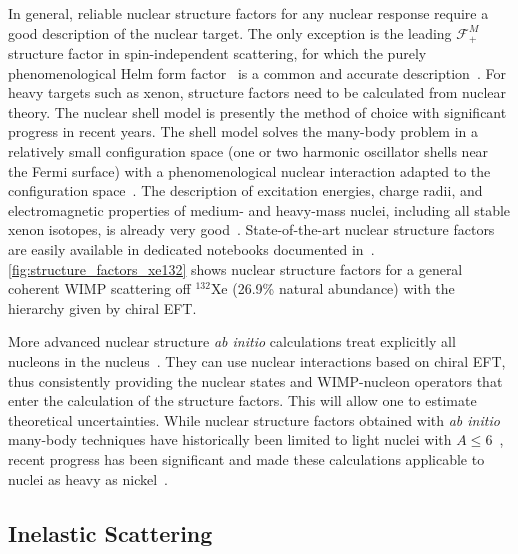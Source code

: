 In general, reliable nuclear structure factors for any nuclear response require a good description of the nuclear target. The only exception is the leading $\mathcal{F}^M_+$ structure factor in spin-independent scattering, for which the purely phenomenological Helm form factor~\cite{Helm:1956zz,Lewin:1995rx} is a common and accurate description~\cite{Vietze:2014vsa}. For heavy targets such as xenon, structure factors need to be calculated from nuclear theory. The nuclear shell model is presently the method of choice with significant progress in recent years. The shell model solves the many-body problem in a relatively small configuration space (one or two harmonic oscillator shells near the Fermi surface) with a phenomenological nuclear interaction adapted to the configuration space~\cite{Caurier:2004gf}. The description of excitation energies, charge radii, and electromagnetic properties of medium- and heavy-mass nuclei, including all stable xenon isotopes, is already very good~\cite{Hoferichter:2018acd,Vietze:2014vsa,Klos:2013rwa}. State-of-the-art nuclear structure factors are easily available in dedicated notebooks documented in~\cite{Hoferichter:2018acd,Anand:2013yka}. \autoref{fig:structure_factors_xe132} shows nuclear structure factors for a general coherent WIMP scattering off $^{132}$Xe (26.9\% natural abundance) with the hierarchy given by chiral EFT.

More advanced nuclear structure {\it ab initio} calculations treat explicitly all nucleons in the nucleus~\cite{Punjabi:2015bba,Navratil:2016ycn}. They can use nuclear interactions based on chiral EFT, thus consistently providing the nuclear states and WIMP-nucleon operators that enter the calculation of the structure factors. This will allow one to estimate theoretical uncertainties. While nuclear structure factors obtained with {\it ab initio} many-body techniques have historically been limited to light nuclei with $A \leq 6$~\cite{Friar:1993kk,Kamada:2001tv,Gazda:2016mrp,Andreoli:2018etf,Korber:2017ery}, recent progress has been significant and made these calculations applicable to nuclei as heavy as nickel~\cite{Hagen:2010zz,Hagen:2012fb,Hergert:2013uja,Hagen:2015yea,Navratil:2016ycn}.

\subsection{Inelastic Scattering}\label{sec:inelastic}

